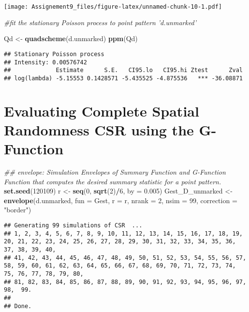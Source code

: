 \documentclass[]{article}
\newenvironment{Shaded}{\begin{snugshade}}{\end{snugshade}}
\newcommand{\CommentTok}[1]{\textcolor[rgb]{0.56,0.35,0.01}{\textit{#1}}}
\newcommand{\DataTypeTok}[1]{\textcolor[rgb]{0.13,0.29,0.53}{#1}}
\newcommand{\DecValTok}[1]{\textcolor[rgb]{0.00,0.00,0.81}{#1}}
\newcommand{\FloatTok}[1]{\textcolor[rgb]{0.00,0.00,0.81}{#1}}
\newcommand{\KeywordTok}[1]{\textcolor[rgb]{0.13,0.29,0.53}{\textbf{#1}}}
\newcommand{\NormalTok}[1]{#1}
\newcommand{\OperatorTok}[1]{\textcolor[rgb]{0.81,0.36,0.00}{\textbf{#1}}}
\newcommand{\StringTok}[1]{\textcolor[rgb]{0.31,0.60,0.02}{#1}}
\begin{document}
\texttt{[image: Assignement9\_files/figure-latex/unnamed-chunk-10-1.pdf]}

\begin{Shaded}
\begin{Highlighting}[]
\CommentTok{#fit the stationary Poisson process to point pattern 'd.unmarked'}

\NormalTok{ Qd <-}\StringTok{ }\KeywordTok{quadscheme}\NormalTok{(d.unmarked) }
 \KeywordTok{ppm}\NormalTok{(Qd) }
\end{Highlighting}
\end{Shaded}

\begin{verbatim}
## Stationary Poisson process
## Intensity: 0.00576742
##             Estimate      S.E.   CI95.lo   CI95.hi Ztest      Zval
## log(lambda) -5.15553 0.1428571 -5.435525 -4.875536   *** -36.08871
\end{verbatim}

\hypertarget{evaluating-complete-spatial-randomness-csr-using-the-g-function}{%
\section{Evaluating Complete Spatial Randomness CSR using the
G-Function}\label{evaluating-complete-spatial-randomness-csr-using-the-g-function}}

\begin{Shaded}
\begin{Highlighting}[]
\CommentTok{## envelope: Simulation Envelopes of Summary Function and G-Function Function that computes the desired summary statistic for a point pattern.}
\KeywordTok{set.seed}\NormalTok{(}\DecValTok{120109}\NormalTok{)}
\NormalTok{r <-}\StringTok{ }\KeywordTok{seq}\NormalTok{(}\DecValTok{0}\NormalTok{, }\KeywordTok{sqrt}\NormalTok{(}\DecValTok{2}\NormalTok{)}\OperatorTok{/}\DecValTok{6}\NormalTok{, }\DataTypeTok{by =} \FloatTok{0.005}\NormalTok{)}
\NormalTok{Gest_D_unmarked <-}\StringTok{ }\KeywordTok{envelope}\NormalTok{(d.unmarked, }\DataTypeTok{fun =}\NormalTok{ Gest, }\DataTypeTok{r =}\NormalTok{ r, }\DataTypeTok{nrank =} \DecValTok{2}\NormalTok{, }\DataTypeTok{nsim =} \DecValTok{99}\NormalTok{, }\DataTypeTok{correction =} \StringTok{"border"}\NormalTok{)}
\end{Highlighting}
\end{Shaded}

\begin{verbatim}
## Generating 99 simulations of CSR  ...
## 1, 2, 3, 4, 5, 6, 7, 8, 9, 10, 11, 12, 13, 14, 15, 16, 17, 18, 19, 20, 21, 22, 23, 24, 25, 26, 27, 28, 29, 30, 31, 32, 33, 34, 35, 36, 37, 38, 39, 40,
## 41, 42, 43, 44, 45, 46, 47, 48, 49, 50, 51, 52, 53, 54, 55, 56, 57, 58, 59, 60, 61, 62, 63, 64, 65, 66, 67, 68, 69, 70, 71, 72, 73, 74, 75, 76, 77, 78, 79, 80,
## 81, 82, 83, 84, 85, 86, 87, 88, 89, 90, 91, 92, 93, 94, 95, 96, 97, 98,  99.
## 
## Done.
\end{verbatim}
\end{document}
